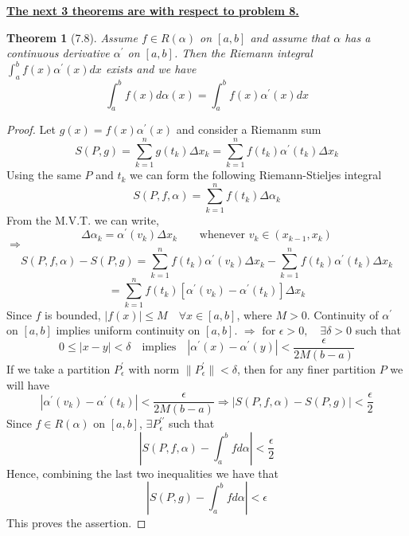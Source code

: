 \documentclass[aps,pra,notitlepage,amsmath,amssymb,letterpaper,12pt]{revtex4-1}
\newtheorem{theorem}{Theorem}
\begin{document}
\underline{\textbf{The next 3 theorems are with respect to problem 8.}}
\begin{theorem}[7.8]
Assume $f \in R(\alpha)$ on $[a,b]$ and assume that $\alpha$ has a continuous derivative $\alpha^\prime$ on $[a,b]$. Then the Riemann integral $\int_{a}^{b} f(x) \alpha^\prime(x)dx$ exists and we have
\[\int_{a}^{b} f(x) d\alpha(x) = \int_{a}^{b} f(x) \alpha^\prime(x)dx\]
\end{theorem}
\begin{proof}
Let $g(x) = f(x)\alpha^\prime(x)$ and consider a Riemanm sum
$$S(P,g) = \sum_{k=1}^{n}g(t_{k})\Delta x_{k} = \sum_{k=1}^{n}f(t_{k})\alpha^\prime(t_{k})\Delta x_{k}$$
Using the same $P$ and $t_{k}$ we can form the following Riemann-Stieljes integral
$$S(P,f,\alpha) =  \sum_{k=1}^{n}f(t_{k})\Delta \alpha_{k}$$
From the M.V.T. we can write,
$$\Delta \alpha_{k} = \alpha^\prime(v_{k}) \Delta x_{k} \qquad \textrm{whenever } v_{k} \in (x_{k-1},x_{k}) $$
$\Longrightarrow$
$$S(P,f,\alpha)-S(P,g) =  \sum_{k=1}^{n}f(t_{k})\alpha^\prime(v_{k}) \Delta x_{k} - \sum_{k=1}^{n}f(t_{k})\alpha^\prime(t_{k})\Delta x_{k} $$
$$= \sum_{k=1}^{n}f(t_{k})[\alpha^\prime(v_{k})-\alpha^\prime(t_{k})]\Delta x_{k}$$
Since $f$ is bounded, $\left|f(x)\right| \leq M \quad \forall x \in [a,b]$, where $M > 0$. Continuity of $\alpha^\prime$ on $[a,b]$ implies uniform continuity on $[a,b]$.
$\Rightarrow \textrm{ for } \epsilon > 0, \quad \exists \delta > 0 $ such that
$$ 0 \leq \left| x - y \right| < \delta \quad \textrm{implies} \quad \left| \alpha^\prime(x)- \alpha^\prime(y) \right| < \frac{\epsilon}{2M(b-a)}$$
If we take a partition $P_{\epsilon}^{\prime}$ with norm $\|P_{\epsilon}^{\prime}\| < \delta$, then for any finer partition $P$ we will have
$$\left| \alpha^\prime(v_{k})- \alpha^\prime(t_{k}) \right| < \frac{\epsilon}{2M(b-a)} \Rightarrow \left| S(P,f,\alpha)-S(P,g) \right| < \frac{\epsilon}{2}$$
Since $f \in R(\alpha)$ on $[a,b]$, $\exists P_{\epsilon}^{\prime \prime}$ such that
$$ \left| S(P,f,\alpha)-\int_{a}^{b}fd\alpha \right| < \frac{\epsilon}{2} $$
Hence, combining the last two inequalities we have that
$$ \left| S(P,g)-\int_{a}^{b}fd\alpha \right| < \epsilon $$
This proves the assertion.\newline{}
\end{proof}
\end{document}
